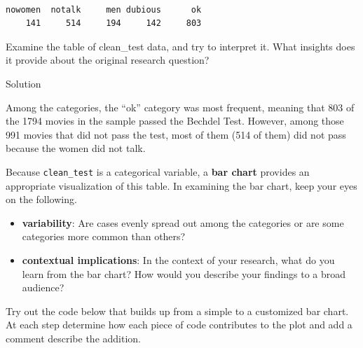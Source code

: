 \documentclass[
  letterpaper,
  DIV=11,
  numbers=noendperiod]{scrreprt}
\newenvironment{Shaded}{\begin{snugshade}}{\end{snugshade}}
\newcommand{\NormalTok}[1]{\textcolor[rgb]{0.00,0.23,0.31}{#1}}
\providecommand{\tightlist}{%
  \setlength{\itemsep}{0pt}\setlength{\parskip}{0pt}}\usepackage{longtable,booktabs,array}
\begin{document}
\begin{verbatim}

nowomen  notalk     men dubious      ok 
    141     514     194     142     803 
\end{verbatim}

\begin{Shaded}
\begin{Highlighting}[]
\NormalTok{Examine the table of \textasciigrave{}clean\_test\textasciigrave{} data, and try to interpret it. What insights does it provide about the original research question?}
\end{Highlighting}
\end{Shaded}

Solution

Among the categories, the ``ok'' category was most frequent, meaning
that 803 of the 1794 movies in the sample passed the Bechdel Test.
However, among those 991 movies that did not pass the test, most of them
(514 of them) did not pass because the women did not talk.

\hfill\break

Because \texttt{clean\_test} is a categorical variable, a \textbf{bar
chart} provides an appropriate visualization of this table. In examining
the bar chart, keep your eyes on the following.

\begin{itemize}
\tightlist
\item
  \textbf{variability}: Are cases evenly spread out among the categories
  or are some categories more common than others?\\
\item
  \textbf{contextual implications}: In the context of your research,
  what do you learn from the bar chart? How would you describe your
  findings to a broad audience?
\end{itemize}

\begin{Shaded}
\begin{Highlighting}[]
\NormalTok{Try out the code below that builds up from a simple to a customized bar chart. At each step determine how each piece of code contributes to the plot and add a comment describe the addition.    }
\end{Highlighting}
\end{Shaded}
\end{document}
